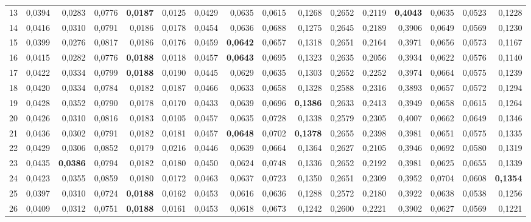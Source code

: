 \begin{table}[htp!]
\begin{adjustwidth}{-2cm}{}
\begin{tabular}{ l | *{15}{| r}}
13	&	0,0394	&	0,0283	&	0,0776	&	\textbf{0,0187}	&	0,0125	&	0,0429	&	0,0635	&	0,0615	&	0,1268	&	0,2652	&	0,2119	&	\textbf{0,4043}	&	0,0635	&	0,0523	&	0,1228	\\
14	&	0,0416	&	0,0310	&	0,0791	&	0,0186	&	0,0178	&	0,0454	&	0,0636	&	0,0688	&	0,1275	&	0,2645	&	0,2189	&	0,3906	&	0,0649	&	0,0569	&	0,1230	\\
15	&	0,0399	&	0,0276	&	0,0817	&	0,0186	&	0,0176	&	0,0459	&	\textbf{0,0642}	&	0,0657	&	0,1318	&	0,2651	&	0,2164	&	0,3971	&	0,0656	&	0,0573	&	0,1167	\\
16	&	0,0415	&	0,0282	&	0,0776	&	\textbf{0,0188}	&	0,0118	&	0,0457	&	\textbf{0,0643}	&	0,0695	&	0,1323	&	0,2635	&	0,2056	&	0,3934	&	0,0622	&	0,0576	&	0,1140	\\
17	&	0,0422	&	0,0334	&	0,0799	&	\textbf{0,0188}	&	0,0190	&	0,0445	&	0,0629	&	0,0635	&	0,1303	&	0,2652	&	0,2252	&	0,3974	&	0,0664	&	0,0575	&	0,1239	\\
18	&	0,0420	&	0,0334	&	0,0784	&	0,0182	&	0,0187	&	0,0466	&	0,0633	&	0,0658	&	0,1328	&	0,2588	&	0,2316	&	0,3893	&	0,0657	&	0,0572	&	0,1294	\\
19	&	0,0428	&	0,0352	&	0,0790	&	0,0178	&	0,0170	&	0,0433	&	0,0639	&	0,0696	&	\textbf{0,1386}	&	0,2633	&	0,2413	&	0,3949	&	0,0658	&	0,0615	&	0,1264	\\
20	&	0,0426	&	0,0310	&	0,0816	&	0,0183	&	0,0105	&	0,0457	&	0,0635	&	0,0728	&	0,1338	&	0,2579	&	0,2305	&	0,4007	&	0,0662	&	0,0649	&	0,1346	\\
21	&	0,0436	&	0,0302	&	0,0791	&	0,0182	&	0,0181	&	0,0457	&	\textbf{0,0648}	&	0,0702	&	\textbf{0,1378}	&	0,2655	&	0,2398	&	0,3981	&	0,0651	&	0,0575	&	0,1335	\\
22	&	0,0429	&	0,0306	&	0,0852	&	0,0179	&	0,0216	&	0,0446	&	0,0639	&	0,0664	&	0,1364	&	0,2627	&	0,2105	&	0,3946	&	0,0692	&	0,0580	&	0,1319	\\
23	&	0,0435	&	\textbf{0,0386}	&	0,0794	&	0,0182	&	0,0180	&	0,0450	&	0,0624	&	0,0748	&	0,1336	&	0,2652	&	0,2192	&	0,3981	&	0,0625	&	0,0655	&	0,1339	\\
24	&	0,0423	&	0,0355	&	0,0859	&	0,0180	&	0,0172	&	0,0463	&	0,0637	&	0,0723	&	0,1350	&	0,2651	&	0,2309	&	0,3952	&	0,0704	&	0,0608	&	\textbf{0,1354}	\\
25	&	0,0397	&	0,0310	&	0,0724	&	\textbf{0,0188}	&	0,0162	&	0,0453	&	0,0616	&	0,0636	&	0,1288	&	0,2572	&	0,2180	&	0,3922	&	0,0638	&	0,0538	&	0,1256	\\
26	&	0,0409	&	0,0312	&	0,0751	&	\textbf{0,0188}	&	0,0161	&	0,0453	&	0,0618	&	0,0673	&	0,1242	&	0,2600	&	0,2221	&	0,3902	&	0,0627	&	0,0569	&	0,1221	\\

\end{tabular}
\end{adjustwidth}
\end{table}
